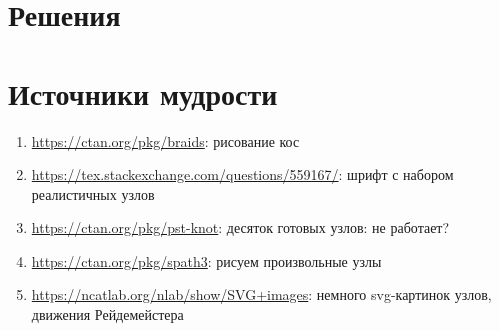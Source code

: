 \documentclass[12pt]{article}
\theoremstyle{definition}
\begin{document}
\section{Решения}



\section{Источники мудрости}


\begin{enumerate}
\item \url{https://ctan.org/pkg/braids}: рисование кос
\item \url{https://tex.stackexchange.com/questions/559167/}: шрифт с набором реалистичных узлов
\item \url{https://ctan.org/pkg/pst-knot}: десяток готовых узлов: не работает?
\item \url{https://ctan.org/pkg/spath3}: рисуем произвольные узлы
\item \url{https://ncatlab.org/nlab/show/SVG+images}: немного svg-картинок узлов, движения Рейдемейстера
\end{enumerate}

\printbibliography[heading=none]
\end{document}
